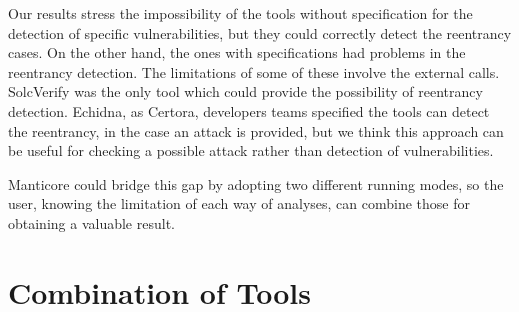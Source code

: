 Our results stress the impossibility of the tools without specification for the detection of specific vulnerabilities, but they could correctly detect the reentrancy cases. 
On the other hand, the ones with specifications had problems in the reentrancy detection. The limitations of some of these involve the external calls. 
SolcVerify was the only tool which could provide the possibility of reentrancy detection. Echidna, as Certora, developers teams specified the tools  can detect the reentrancy, in the case an attack is provided, 
but we think this approach can be useful for checking a possible attack rather than detection of vulnerabilities.

Manticore could bridge this gap by adopting two different running modes, so the user, knowing the limitation of each way of analyses, can combine those for obtaining a valuable result.


\section{Combination of Tools}
